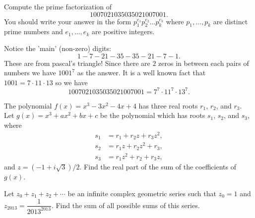 \documentclass[11pt]{article}
\theoremstyle{definition}
\begin{document}
%	




\begin{question}[name={2013 HMMT, Guts, \href{https://artofproblemsolving.com/community/c129h526551p2986211}{Problem 11}}]
	Compute the prime factorization of $$1007021035035021007001.$$ You should write your answer in the form $p_1^{e_1}p_2^{e_2}\ldots p_k^{e_k}$ where $p_1,\ldots,p_k$ are distinct prime numbers and $e_1,\ldots,e_k$ are positive integers.
\end{question}




\begin{solution}[name={Solution by forthegreatergood}]
	Notice the 'main' (non-zero) digits:
	$$1 - 7 -21 - 35 - 35 - 21 - 7 - 1.$$
	These are from pascal's triangle! Since there are $2$ zeros in between each pairs of numbers we have $1001^7$ as the answer. It is a well known fact that $1001 = 7 \cdot 11\cdot 13$ so we have $$1007021035035021007001 = \boxed{7^7\cdot 11^7\cdot 13^7}.$$
\end{solution}






\begin{question}[name={2013 HMMT, Guts, \href{https://artofproblemsolving.com/community/c129h526560p2986230}{Problem 20}}]
	The polynomial $f(x)=x^3-3x^2-4x+4$ has three real roots $r_1$, $r_2$, and $r_3$. Let $g(x)=x^3+ax^2+bx+c$ be the polynomial which has roots $s_1$, $s_2$, and $s_3$, where
	\begin{align*}
		s_1 &= r_1+r_2z+r_3z^2,\\
		s_2 &= r_1z+r_2z^2+r_3,\\
		s_3 &= r_1z^2+r_2+r_3z,
	\end{align*}
	and $z=({-1+i\sqrt3})/2.$ Find the real part of the sum of the coefficients of $g(x)$.	
\end{question}




%	







\begin{question}[name={2013 HMMT, Guts, \href{https://artofproblemsolving.com/community/c129h526568p2986247}{Problem 28}}]
	Let $z_0+z_1+z_2+\cdots$ be an infinite complex geometric series such that $z_0=1$ and $z_{2013}=\dfrac 1{2013^{2013}}$. Find the sum of all possible sums of this series.
\end{question}
\end{document}
